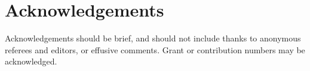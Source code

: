 \documentclass[fleqn,10pt]{wlscirep}
\begin{document}
%
%
%
%





\section*{Acknowledgements} %

Acknowledgements should be brief, and should not include thanks to anonymous referees and editors, or effusive comments. Grant or contribution numbers may be acknowledged.
\end{document}
